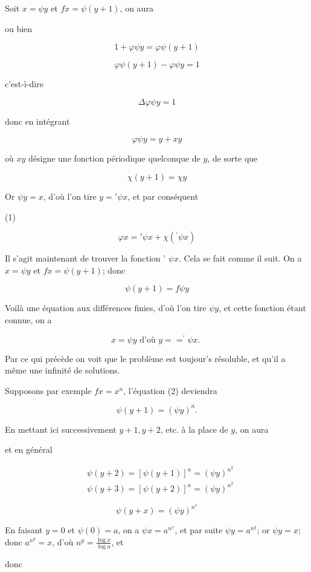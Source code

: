 \documentclass{article}
\begin{document}
Soit \(x=\psi y\) et \(f x=\psi(y+1)\), on aura

ou bien

\[
1+\varphi \psi y=\varphi \psi(y+1)
\]

\[
\varphi \psi(y+1)-\varphi \psi y=1
\]

c'est-ì-dire

\[
\Delta \varphi \psi y=1
\]

donc en intégrant

\[
\varphi \psi y=y+x y
\]

où \(x y\) désigne une fonction périodique quelconque de \(y\), de sorte que

\[
\chi(y+1)=\chi y
\]

Or \(\psi y=x\), d'où l'on tire \(y=' \psi x\), et par conséquent

(1)

\[
\varphi x=' \psi x+\chi\left(^{\prime} \psi x\right)
\]

Il s'agit maintenant de trouver la fonction ' \(\psi x\). Cela se fait comme il suit. On a \(x=\psi y\) et \(f x=\psi(y+1)\); donc

\[
\psi(y+1)=f \psi y
\]

Voilà une équation aux différences finies, d'où l'on tire \(\psi y\), et cette fonction étant connue, on a

\[
x=\psi y \text { d'où } y==^{\prime} \psi x \text {. }
\]

Par ce qui précède on voit que le problème est toujour's résoluble, et qu'il a même une infinité de solutions.

Supposons par exemple \(f x=x^{n}\), l'équation (2) deviendra

\[
\psi(y+1)=(\psi y)^{n} .
\]

En mettant ici successivement \(y+1, y+2\), etc. à la place de \(y\), on aura

et en général

\[
\begin{aligned}
& \psi(y+2)=[\psi(y+1)]^{n}=(\psi y)^{n^{2}} \\
& \psi(y+3)=[\psi(y+2)]^{n}=(\psi y)^{n^{2}}
\end{aligned}
\]

\[
\psi(y+x)=(\psi y)^{n^{x}}
\]

En faisant \(y=0\) et \(\psi(0)=a\), on a \(\psi x=a^{n^{x}}\), et par suite \(\psi y=a^{n^{y}}\); or \(\psi y=x ;\) donc \(a^{n^{y}}=x\), d'où \(n^{y}=\frac{\log x}{\log a}\), et

donc
\end{document}
